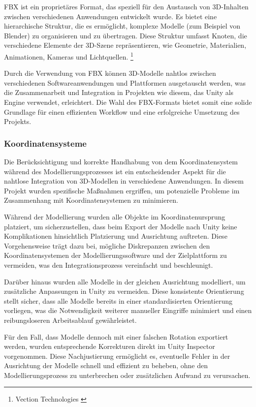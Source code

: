 FBX ist ein proprietäres Format, das speziell für den Austausch von 3D-Inhalten zwischen verschiedenen Anwendungen entwickelt wurde. Es bietet eine hierarchische Struktur, die es ermöglicht, komplexe Modelle (zum Beispiel von Blender) zu organisieren und zu übertragen. Diese Struktur umfasst Knoten, die verschiedene Elemente der 3D-Szene repräsentieren, wie Geometrie, Materialien, Animationen, Kameras und Lichtquellen. \footnote{Vection Technologies \cite {Everything You Need to Know About FBX Files}}

Durch die Verwendung von FBX können 3D-Modelle nahtlos zwischen verschiedenen Softwareanwendungen und Plattformen ausgetauscht werden, was die Zusammenarbeit und Integration in Projekten wie diesem, das Unity als Engine verwendet, erleichtert. Die Wahl des FBX-Formats bietet somit eine solide Grundlage für einen effizienten Workflow und eine erfolgreiche Umsetzung des Projekts.

\subsubsection{Koordinatensysteme}
Die Berücksichtigung und korrekte Handhabung von dem Koordinatensystem während des Modellierungsprozesses ist ein entscheidender Aspekt für die nahtlose Integration von 3D-Modellen in verschiedene Anwendungen. In diesem Projekt wurden spezifische Maßnahmen ergriffen, um potenzielle Probleme im Zusammenhang mit Koordinatensystemen zu minimieren.

Während der Modellierung wurden alle Objekte im Koordinatenursprung platziert, um sicherzustellen, dass beim Export der Modelle nach Unity keine Komplikationen hinsichtlich Platzierung und Ausrichtung auftreten. Diese Vorgehensweise trägt dazu bei, mögliche Diskrepanzen zwischen den Koordinatensystemen der Modellierungssoftware und der Zielplattform zu vermeiden, was den Integrationsprozess vereinfacht und beschleunigt.

Darüber hinaus wurden alle Modelle in der gleichen Ausrichtung modelliert, um zusätzliche Anpassungen in Unity zu vermeiden. Diese konsistente Orientierung stellt sicher, dass alle Modelle bereits in einer standardisierten Orientierung vorliegen, was die Notwendigkeit weiterer manueller Eingriffe minimiert und einen reibungsloseren Arbeitsablauf gewährleistet.

Für den Fall, dass Modelle dennoch mit einer falschen Rotation exportiert werden, wurden entsprechende Korrekturen direkt im Unity Inspector vorgenommen. Diese Nachjustierung ermöglicht es, eventuelle Fehler in der Ausrichtung der Modelle schnell und effizient zu beheben, ohne den Modellierungsprozess zu unterbrechen oder zusätzlichen Aufwand zu verursachen.

